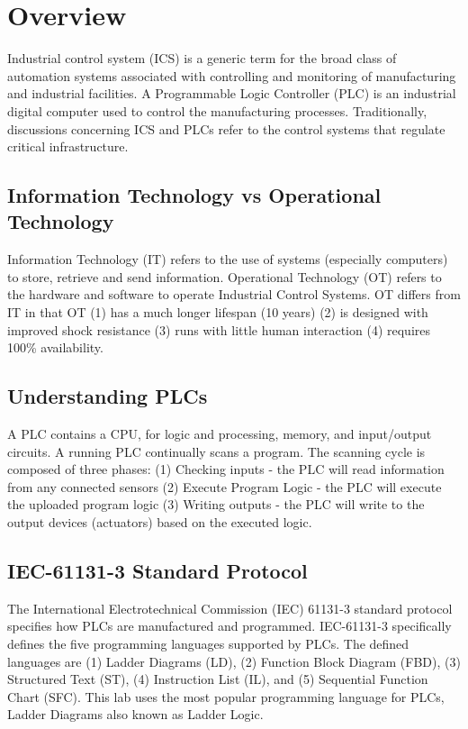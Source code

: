\section{Overview}
Industrial control system (ICS) is a generic term for the broad class of automation systems associated with controlling and monitoring of manufacturing and industrial facilities. A Programmable Logic Controller (PLC) is an industrial digital computer used to control the manufacturing processes. Traditionally, discussions concerning ICS and PLCs refer to the control systems that regulate critical infrastructure. 


\subsection{Information Technology vs Operational Technology}
Information Technology (IT) refers to the use of systems (especially computers) to store, retrieve and send information. Operational Technology (OT) refers to the hardware and software to operate Industrial Control Systems. OT differs from IT in that OT (1) has a much longer lifespan (10 years) (2) is designed with improved shock resistance (3) runs with little human interaction (4) requires 100\% availability.


\subsection{Understanding PLCs}
A PLC contains a CPU, for logic and processing, memory, and input/output circuits. A running PLC continually scans a program. The scanning cycle is composed of three phases: (1) Checking inputs - the PLC will read information from any connected sensors (2) Execute Program Logic - the PLC will execute the uploaded program logic (3) Writing outputs - the PLC will write to the output devices (actuators) based on the executed logic.


\subsection{IEC-61131-3 Standard Protocol}
The International Electrotechnical Commission (IEC) 61131-3 standard protocol specifies how PLCs are  manufactured and programmed. IEC-61131-3 specifically defines the five programming languages supported by PLCs. The defined languages are (1) Ladder Diagrams (LD), (2) Function Block Diagram (FBD), (3) Structured Text (ST), (4) Instruction List (IL), and (5) Sequential Function Chart (SFC). This lab uses the most popular programming language for PLCs, Ladder Diagrams also known as Ladder Logic.


